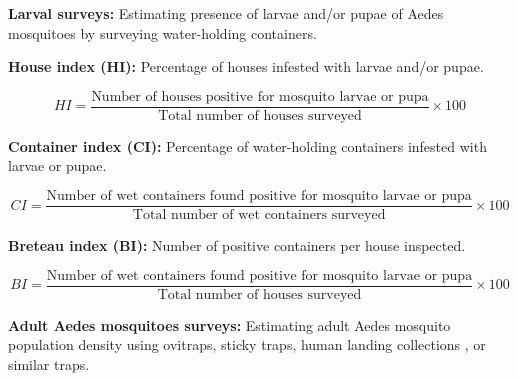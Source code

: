 \documentclass[review]{elsarticle}
\begin{document}
\textbf{Larval surveys:} Estimating presence of larvae and/or pupae of Aedes mosquitoes by surveying water-holding containers.

\textbf{House index (HI):} Percentage of houses infested with larvae and/or pupae.

\begin{equation}
\label{eq:hi}
HI =  \frac{\textrm{Number of houses positive for mosquito larvae or pupa}}{\textrm{Total number of houses surveyed}}  \times 100 
\end{equation}

\textbf{Container index (CI):} Percentage of water-holding containers infested with larvae or pupae.

\begin{equation}
\label{eq:ci}
CI =  \frac{\textrm{Number of wet containers found positive for mosquito larvae or pupa}}{\textrm{Total number of wet containers surveyed}}  \times 100 
\end{equation}

\textbf{Breteau index (BI):} Number of positive containers per house inspected.

\begin{equation}
\label{eq:bi}
BI =  \frac{\textrm{Number of wet containers found positive for mosquito larvae or pupa}}{\textrm{Total number of houses surveyed}}  \times 100 
\end{equation}

\textbf{Adult Aedes mosquitoes surveys:} Estimating adult Aedes mosquito population density using ovitraps, sticky traps, human landing collections \cite{barnard2014measurement}, or similar traps. 

%
%
\end{document}
